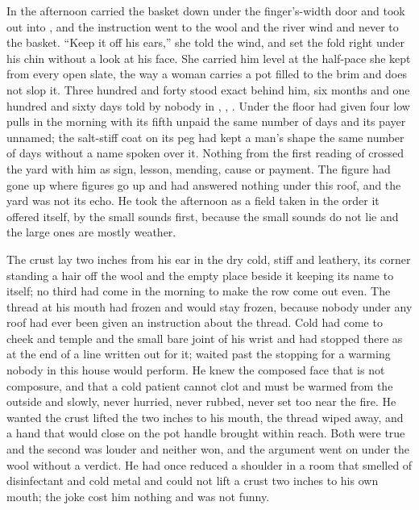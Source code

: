 In the afternoon  carried the basket down under the finger's-width door and took  out into , and the instruction went to the wool and the river wind and never to the basket. “Keep it off his ears,” she told the wind, and set the fold right under his chin without a look at his face. She carried him level at the half-pace she kept from every open slate, the way a woman carries a pot filled to the brim and does not slop it. Three hundred and forty stood exact behind him, six months and one hundred and sixty days told by nobody in , , . Under the floor  had given four low pulls in the morning with its fifth unpaid the same number of days and its payer unnamed; the salt-stiff coat on its peg had kept a man's shape the same number of days without a name spoken over it. Nothing from the first reading of  crossed the yard with him as sign, lesson, mending, cause or payment. The figure had gone up where figures go up and had answered nothing under this roof, and the yard was not its echo. He took the afternoon as a field taken in the order it offered itself, by the small sounds first, because the small sounds do not lie and the large ones are mostly weather.

The crust lay two inches from his ear in the dry cold, stiff and leathery, its corner standing a hair off the wool and the empty place beside it keeping its name to itself; no third had come in the morning to make the row come out even. The thread at his mouth had frozen and would stay frozen, because nobody under any roof had ever been given an instruction about the thread. Cold had come to cheek and temple and the small bare joint of his wrist and had stopped there as at the end of a line written out for it;  waited past the stopping for a warming nobody in this house would perform. He knew the composed face that is not composure, and that a cold patient cannot clot and must be warmed from the outside and slowly, never hurried, never rubbed, never set too near the fire. He wanted the crust lifted the two inches to his mouth, the thread wiped away, and a hand that would close on the pot handle brought within reach. Both were true and the second was louder and neither won, and the argument went on under the wool without a verdict. He had once reduced a shoulder in a room that smelled of disinfectant and cold metal and could not lift a crust two inches to his own mouth; the joke cost him nothing and was not funny.

